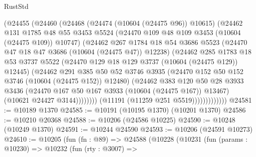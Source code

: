 \begin{lexlean}{RustStd}
\begin{coremodule}
                        (@24455
                          (@24460
                            (@24468
                              (@24474 (@10604 (@24475 @96)) @10615)
                              (@24462
                                @131
                                @1785
                                @48
                                @55
                                @3453
                                @5524
                                (@24470 @109 @48 @109 @3453 (@10604 (@24475 @109)) @10747)
                                (@24462
                                  @267
                                  @1784
                                  @18
                                  @54
                                  @3686
                                  @5523
                                  (@24470 @47 @18 @47 @3686 (@10604 (@24475 @47)) @12238)
                                  (@24462
                                    @285
                                    @1783
                                    @18
                                    @53
                                    @3737
                                    @5522
                                    (@24470 @129 @18 @129 @3737 (@10604 (@24475 @129)) @12445)
                                    (@24462
                                      @291
                                      @385
                                      @50
                                      @52
                                      @3746
                                      @3935
                                      (@24470 @152 @50 @152 @3746 (@10604 (@24475 @152)) @12480)
                                      (@24462
                                        @383
                                        @120
                                        @50
                                        @28
                                        @3933
                                        @3436
                                        (@24470 @167 @50 @167 @3933 (@10604 (@24475 @167)) @13467)
                                        (@10621 @24427 @3144))))))))
                          (@11191 (@11259 @251 @5519)))))))))))))
@24581 := @10189 @1370
@24585 := @10191 (@10195 @1370) (@10201 @1370)
@24586 := @10210 @20368
@24588 := @10206 (@24586 @10225)
@24590 := @10248 (@10249 @1370)
@24591 := @10244 @24590
@24593 := @10206 (@24591 @10273)
@24610 := @10205
    (fun (fn : @89) =>
    @24588
      (@10228
        (@10231
          (fun (params : @10230) =>
          @10232
            (fun (rty : @3007) =>

\end{coremodule}
\end{lexlean}
